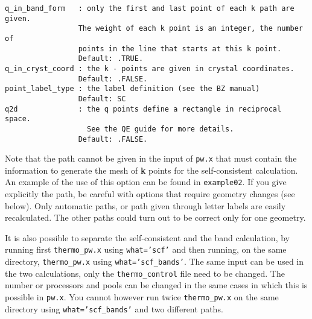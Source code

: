 \documentclass[12pt,a4paper]{article}
\begin{document}
\begin{verbatim}
q_in_band_form   : only the first and last point of each k path are given.
                 The weight of each k point is an integer, the number of 
                 points in the line that starts at this k point.
                 Default: .TRUE.
q_in_cryst_coord : the k - points are given in crystal coordinates.
                 Default: .FALSE.
point_label_type : the label definition (see the BZ manual)
                 Default: SC
q2d              : the q points define a rectangle in reciprocal space.
                   See the QE guide for more details.
                 Default: .FALSE.
\end{verbatim}
Note that the path cannot be given in the input of \texttt{pw.x} that
must contain the information to generate the mesh of {\bf k} points 
for the self-consistent calculation. 
An example of the use of this option can be found in \texttt{example02}.
If you give explicitly the path, be careful with options that require
geometry changes (see below). Only automatic paths, or path given through 
letter labels are easily recalculated. The other paths could turn out 
to be correct only for one geometry.

It is also possible to separate the self-consistent and the band calculation,
by running first \texttt{thermo\_pw.x} using \texttt{what='scf'} and then
running, on the same directory, \texttt{thermo\_pw.x} using 
\texttt{what='scf\_bands'}. The same input can be used in the two 
calculations, only the \texttt{thermo\_control} file need to be changed. 
The number or processors and pools can be changed in the same cases in
which this is possible in \texttt{pw.x}.
You cannot however run twice \texttt{thermo\_pw.x} on the same 
directory using \texttt{what='scf\_bands'} and two different paths.
\end{document}
